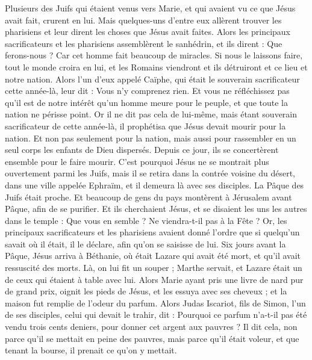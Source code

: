 \begin{multicols}{2}
Plusieurs des Juifs qui étaient venus vers Marie, et qui avaient vu ce que Jésus avait fait, crurent en lui.
Mais quelques-uns d'entre eux allèrent trouver les pharisiens et leur dirent les choses que Jésus avait faites.
Alors les principaux sacrificateurs et les pharisiens assemblèrent le sanhédrin, et ils dirent : Que ferons-nous ? Car cet homme fait beaucoup de miracles.
Si nous le laissons faire, tout le monde croira en lui, et les Romains viendront et ils détruiront et ce lieu et notre nation.
Alors l'un d'eux appelé Caïphe, qui était le souverain sacrificateur cette année-là, leur dit : Vous n'y comprenez rien.
Et vous ne réfléchissez pas qu'il est de notre intérêt qu'un homme meure pour le peuple, et que toute la nation ne périsse point.
Or il ne dit pas cela de lui-même, mais étant souverain sacrificateur de cette année-là, il prophétisa que Jésus devait mourir pour la nation.
Et non pas seulement pour la nation, mais aussi pour rassembler en un seul corps les enfants de Dieu dispersés.
Depuis ce jour, ils se concertèrent ensemble pour le faire mourir.
C'est pourquoi Jésus ne se montrait plus ouvertement parmi les Juifs, mais il se retira dans la contrée voisine du désert, dans une ville appelée Ephraïm, et il demeura là avec ses disciples.
La Pâque des Juifs était proche. Et beaucoup de gens du pays montèrent à Jérusalem avant Pâque, afin de se purifier.
Et ils cherchaient Jésus, et se disaient les uns les autres dans le temple : Que vous en semble ? Ne viendra-t-il pas à la Fête ?
Or, les principaux sacrificateurs et les pharisiens avaient donné l'ordre que si quelqu'un savait où il était, il le déclare, afin qu'on se saisisse de lui.
\VerseOne{}Six jours avant la Pâque, Jésus arriva à Béthanie, où était Lazare qui avait été mort, et qu'il avait ressuscité des morts.
Là, on lui fit un souper ; Marthe servait, et Lazare était un de ceux qui étaient à table avec lui.
Alors Marie ayant pris une livre de nard pur de grand prix, oignit les pieds de Jésus, et les essuya avec ses cheveux ; et la maison fut remplie de l'odeur du parfum.
Alors Judas Iscariot, fils de Simon, l'un de ses disciples, celui qui devait le trahir, dit :
Pourquoi ce parfum n'a-t-il pas été vendu trois cents deniers, pour donner cet argent aux pauvres ?
Il dit cela, non parce qu'il se mettait en peine des pauvres, mais parce qu'il était voleur, et que tenant la bourse, il prenait ce qu'on y mettait.

\end{multicols}
